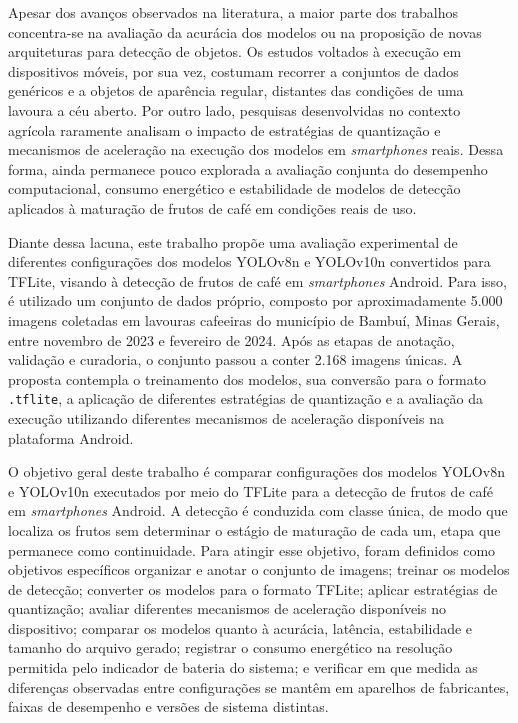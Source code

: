\documentclass[artigo,times,capa]{iftex2024}
\begin{document}
Apesar dos avanços observados na literatura, a maior parte dos trabalhos concentra-se na avaliação da acurácia dos modelos ou na proposição de novas arquiteturas para detecção de objetos. Os estudos voltados à execução em dispositivos móveis, por sua vez, costumam recorrer a conjuntos de dados genéricos e a objetos de aparência regular, distantes das condições de uma lavoura a céu aberto. Por outro lado, pesquisas desenvolvidas no contexto agrícola raramente analisam o impacto de estratégias de quantização e mecanismos de aceleração na execução dos modelos em \textit{smartphones} reais. Dessa forma, ainda permanece pouco explorada a avaliação conjunta do desempenho computacional, consumo energético e estabilidade de modelos de detecção aplicados à maturação de frutos de café em condições reais de uso.

Diante dessa lacuna, este trabalho propõe uma avaliação experimental de diferentes configurações dos modelos YOLOv8n e YOLOv10n convertidos para \ac{TFLite}, visando à detecção de frutos de café em \textit{smartphones} Android. Para isso, é utilizado um conjunto de dados próprio, composto por aproximadamente 5.000 imagens coletadas em lavouras cafeeiras do município de Bambuí, Minas Gerais, entre novembro de 2023 e fevereiro de 2024. Após as etapas de anotação, validação e curadoria, o conjunto passou a conter 2.168 imagens únicas. A proposta contempla o treinamento dos modelos, sua conversão para o formato \texttt{.tflite}, a aplicação de diferentes estratégias de quantização e a avaliação da execução utilizando diferentes mecanismos de aceleração disponíveis na plataforma Android.

O objetivo geral deste trabalho é comparar configurações dos modelos YOLOv8n e YOLOv10n executados por meio do \ac{TFLite} para a detecção de frutos de café em
\textit{smartphones} Android. A detecção é conduzida com classe única, de
modo que localiza os frutos sem determinar o estágio de maturação de cada um,
etapa que permanece como continuidade. Para atingir esse objetivo, foram definidos como objetivos específicos organizar e anotar o conjunto de imagens; treinar os modelos de detecção; converter os modelos para o formato \ac{TFLite}; aplicar estratégias de quantização; avaliar diferentes mecanismos de aceleração disponíveis no dispositivo; comparar os modelos quanto à acurácia, latência, estabilidade e tamanho do arquivo gerado; registrar o consumo energético na resolução permitida pelo indicador de bateria do sistema; e verificar em que medida as diferenças observadas entre configurações se mantêm em aparelhos de fabricantes, faixas de desempenho e versões de sistema distintas.
\end{document}
